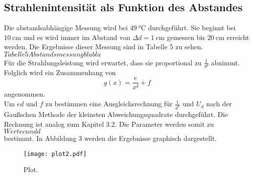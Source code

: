 \subsection{Strahlenintensität als Funktion des Abstandes}
Die abstandsabhängige Messung wird bei $\SI{49}{\celsius}$ durchgeführt.
Sie beginnt bei $\SI{10}{\cm}$ und es wird immer im Abstand von $\Delta d = \SI{1}{\cm}$ gemessen bis $\SI{20}{\cm}$ erreicht werden.
Die Ergebnisse dieser Messung sind in Tabelle 5 zu sehen.\\
$Tabelle 5 Abstandsmessung blabla$\\
Für die Strahlungsleistung wird erwartet, dass sie proportional zu $\frac{1}{d²}$ abnimmt.
Folglich wird ein Zusammenhang von
\begin{equation}
  g(x) = \frac{e}{x²} + f
\end{equation}
angenommen.\\
Um $ed$ und $f$ zu bestimmen eine Ausgleichsrechnung für $\frac{1}{d^2}$ und $U_d$ nach der Gaußschen Methode der kleinsten Abweichungsquadrate durchgeführt.
Die Rechnung ist analog zum Kapitel 3.2.
Die Parameter werden somit zu
\\
$Werte c und d$
\\
bestimmt. In Abbildung 3 werden die Ergebnisse graphisch dargestellt.
\begin{figure}[H]
  \centering
  \texttt{[image: plot2.pdf]}
  \caption{Plot.}
  \label{fig:plot2}
\end{figure}
